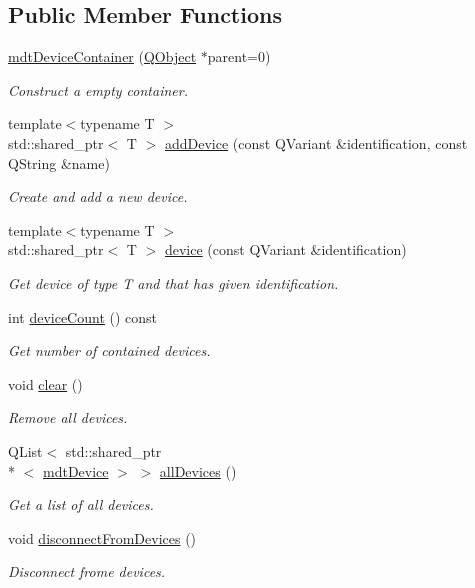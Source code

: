 \subsection*{Public Member Functions}
\begin{DoxyCompactItemize}
\item 
\hyperlink{classmdt_device_container_a8e68b1aac362bc6edff3209d00c2ad4d}{mdt\-Device\-Container} (\hyperlink{class_q_object}{Q\-Object} $\ast$parent=0)
\begin{DoxyCompactList}\small\item\em Construct a empty container. \end{DoxyCompactList}\item 
{\footnotesize template$<$typename T $>$ }\\std\-::shared\-\_\-ptr$<$ T $>$ \hyperlink{classmdt_device_container_a843e03b57889faac6e062860e95caad1}{add\-Device} (const Q\-Variant \&identification, const Q\-String \&name)
\begin{DoxyCompactList}\small\item\em Create and add a new device. \end{DoxyCompactList}\item 
{\footnotesize template$<$typename T $>$ }\\std\-::shared\-\_\-ptr$<$ T $>$ \hyperlink{classmdt_device_container_a6361dffbdc3d47f0cce86f78b5f202eb}{device} (const Q\-Variant \&identification)
\begin{DoxyCompactList}\small\item\em Get device of type T and that has given identification. \end{DoxyCompactList}\item 
int \hyperlink{classmdt_device_container_a95168e7221db07ea8df6a2c028ebf560}{device\-Count} () const 
\begin{DoxyCompactList}\small\item\em Get number of contained devices. \end{DoxyCompactList}\item 
void \hyperlink{classmdt_device_container_a18ade1b299dcf87e0097c24cb346f36f}{clear} ()
\begin{DoxyCompactList}\small\item\em Remove all devices. \end{DoxyCompactList}\item 
Q\-List$<$ std\-::shared\-\_\-ptr\\*
$<$ \hyperlink{classmdt_device}{mdt\-Device} $>$ $>$ \hyperlink{classmdt_device_container_a9a04f05d7cce394fd30f8669edb6a181}{all\-Devices} ()
\begin{DoxyCompactList}\small\item\em Get a list of all devices. \end{DoxyCompactList}\item 
void \hyperlink{classmdt_device_container_a45465d82f6ed697366d5d45de2334855}{disconnect\-From\-Devices} ()
\begin{DoxyCompactList}\small\item\em Disconnect frome devices. \end{DoxyCompactList}\end{DoxyCompactItemize}


